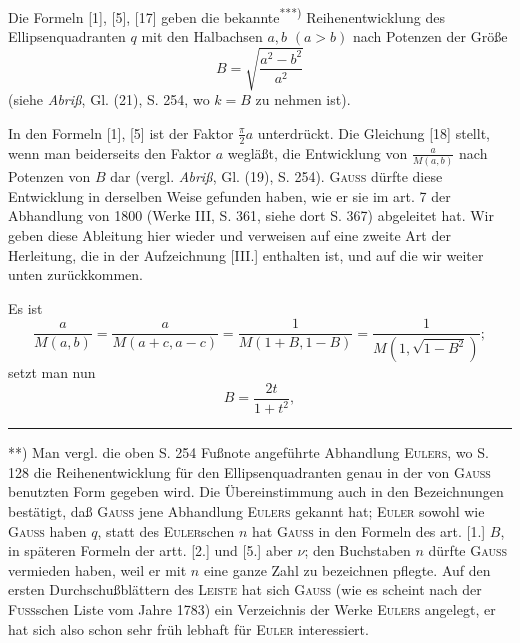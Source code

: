 \begingroup
\makeatletter\tagsleft@true\let\veqno\@@leqno\makeatother
\fancyhead{}
\begin{center}\end{center}
\par\indent Die Formeln [1], [5], [17] geben die bekannte\textsuperscript{***)} Reihenentwicklung des Ellipsenquadranten $q$ mit den Halbachsen $a,b$ $(a>b)$ nach Potenzen der Größe
\[B=\sqrt{\frac{a^2-b^2}{a^2}}\]
\noindent (siehe \textit{Abriß}, Gl. (21), S. 254, wo $k=B$ zu nehmen ist).
\par\indent In den Formeln [1], [5] ist der Faktor $\frac\pi2a$ unterdrückt. Die Gleichung [18] stellt, wenn man beiderseits den Faktor $a$ wegläßt, die Entwicklung von $\frac{a}{M(a,b)}$ nach Potenzen von $B$ dar (vergl. \textit{Abriß}, Gl. (19), S. 254). \textsc{Gauss} dürfte diese Entwicklung in derselben Weise gefunden haben, wie er sie im art. 7 der Abhandlung von 1800 (Werke III, S. 361, siehe dort S. 367) abgeleitet hat. Wir geben diese Ableitung hier wieder und verweisen auf eine zweite Art der Herleitung, die in der Aufzeichnung [III.] enthalten ist, und auf die wir weiter unten zurückkommen.
\par\indent Es ist
\[\frac{a}{M(a,b)}=\frac{a}{M(a+c,a-c)}=\frac1{M(1+B,1-B)}=\frac1{M(1,\sqrt{1-B^2})};\]
\noindent setzt man nun
\[B=\frac{2t}{1+t^2},\]
\vfill
\par\smallskip\noindent\rule{.25\linewidth}{.4pt}\par
{\small\par\indent ***) Man vergl. die oben S. 254 Fußnote angeführte Abhandlung \textsc{Eulers}, wo S. 128 die Reihenentwicklung für den Ellipsenquadranten genau in der von \textsc{Gauss} benutzten Form gegeben wird. Die Übereinstimmung auch in den Bezeichnungen bestätigt, daß \textsc{Gauss} jene Abhandlung \textsc{Eulers} gekannt hat; \textsc{Euler} sowohl wie \textsc{Gauss} haben $q$, statt des \textsc{Euler}schen $n$ hat \textsc{Gauss} in den Formeln des art. [1.] $B$, in späteren Formeln der artt. [2.] und [5.] aber $\nu$; den Buchstaben $n$ dürfte \textsc{Gauss} vermieden haben, weil er mit $n$ eine ganze Zahl zu bezeichnen pflegte. Auf den ersten Durchschußblättern des \textsc{Leiste} hat sich \textsc{Gauss} (wie es scheint nach der \textsc{Fuss}schen Liste vom Jahre 1783) ein Verzeichnis der Werke \textsc{Eulers} angelegt, er hat sich also schon sehr früh lebhaft für \textsc{Euler} interessiert.\par}
